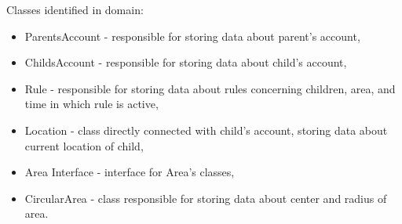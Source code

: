 \documentclass{sprawozdanie-agh}
\begin{document}
		Classes identified in domain:
		\begin{itemize}
			\item ParentsAccount - responsible for storing data about parent's account,
			\item ChildsAccount - responsible for storing data about child's account,
			\item Rule - responsible for storing data about rules concerning children, area, and time in which rule is active, 
			\item Location - class directly connected with child's account, storing data about current location of child,
			\item Area Interface - interface for Area's classes,
			\item CircularArea - class responsible for storing data about center and radius of area.
		\end{itemize}
\end{document}
